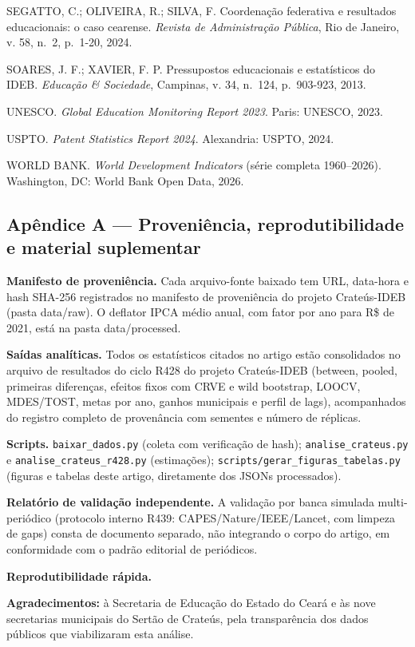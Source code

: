 \documentclass[
  brazilian,
  12pt,
  a4paper,
]{article}
\begin{document}
SEGATTO, C.; OLIVEIRA, R.; SILVA, F. Coordenação federativa e resultados
educacionais: o caso cearense. \emph{Revista de Administração Pública},
Rio de Janeiro, v. 58, n.~2, p.~1-20, 2024.

SOARES, J. F.; XAVIER, F. P. Pressupostos educacionais e estatísticos do
IDEB. \emph{Educação \& Sociedade}, Campinas, v. 34, n.~124, p.~903-923,
2013.

UNESCO. \emph{Global Education Monitoring Report 2023}. Paris: UNESCO,
2023.

USPTO. \emph{Patent Statistics Report 2024}. Alexandria: USPTO, 2024.

WORLD BANK. \emph{World Development Indicators} (série completa
1960--2026). Washington, DC: World Bank Open Data, 2026.

\subsection{Apêndice A --- Proveniência, reprodutibilidade e material
suplementar}\label{apuxeandice-a-proveniuxeancia-reprodutibilidade-e-material-suplementar}

\textbf{Manifesto de proveniência.} Cada arquivo-fonte baixado tem URL,
data-hora e hash SHA-256 registrados no manifesto de proveniência do
projeto Crateús-IDEB (pasta data/raw). O deflator IPCA médio anual, com
fator por ano para R\$ de 2021, está na pasta data/processed.

\textbf{Saídas analíticas.} Todos os estatísticos citados no artigo
estão consolidados no arquivo de resultados do ciclo R428 do projeto
Crateús-IDEB (between, pooled, primeiras diferenças, efeitos fixos com
CRVE e wild bootstrap, LOOCV, MDES/TOST, metas por ano, ganhos
municipais e perfil de lags), acompanhados do registro completo de
provenância com sementes e número de réplicas.

\textbf{Scripts.} \texttt{baixar\_dados.py} (coleta com verificação de
hash); \texttt{analise\_crateus.py} e \texttt{analise\_crateus\_r428.py}
(estimações); \texttt{scripts/gerar\_figuras\_tabelas.py} (figuras e
tabelas deste artigo, diretamente dos JSONs processados).

\textbf{Relatório de validação independente.} A validação por banca
simulada multi-periódico (protocolo interno R439:
CAPES/Nature/IEEE/Lancet, com limpeza de gaps) consta de documento
separado, não integrando o corpo do artigo, em conformidade com o padrão
editorial de periódicos.

\textbf{Reprodutibilidade rápida.}

\endgroup

\textbf{Agradecimentos:} à Secretaria de Educação do Estado do Ceará e
às nove secretarias municipais do Sertão de Crateús, pela transparência
dos dados públicos que viabilizaram esta análise.
\end{document}
